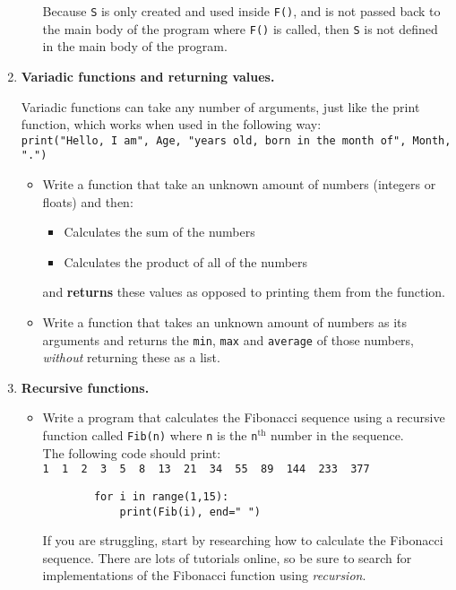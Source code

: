 \documentclass[11pt]{report}
\begin{document}
\begin{enumerate}
\begin{itemize}
		Because {\tt S} is only created and used inside {\tt F()}, and is not passed back to the main body of the program where {\tt F()} is called, then {\tt S} is not defined in the main body of the program.
	\end{itemize}

	\item \textbf{Variadic functions and returning values.}

	Variadic functions can take any number of arguments, just like the print function, which works when used in the following way:\\
	{\tt print("Hello, I am", Age, "years old, born in the month of", Month, ".")}
	\begin{itemize}
		\item Write a function that take an unknown amount of numbers (integers or floats) and then:
		\begin{itemize}
			\item Calculates the sum of the numbers
			\item Calculates the product of all of the numbers
		\end{itemize}
		and \textbf{returns} these values as opposed to printing them from the function.

		\item Write a function that takes an unknown amount of numbers as its arguments and returns the {\tt min}, {\tt max} and {\tt average} of those numbers, \emph{without} returning these as a list.
	\end{itemize}

	\item \textbf{Recursive functions.}
	\begin{itemize}
		\item Write a program that calculates the Fibonacci sequence using a recursive function called {\tt Fib(n)} where {\tt n} is the {\tt n$^{\text{th}}$} number in the sequence.\\

		The following code should print:\\
		{\tt 1~~1~~2~~3~~5~~8~~13~~21~~34~~55~~89~~144~~233~~377}

		\begin{verbatim}
		for i in range(1,15):
		    print(Fib(i), end=" ")
		\end{verbatim}

		If you are struggling, start by researching how to calculate the Fibonacci sequence. There are lots of tutorials online, so be sure to search for implementations of the Fibonacci function using \emph{recursion}.\\


\end{itemize}
\end{enumerate}
\end{document}
